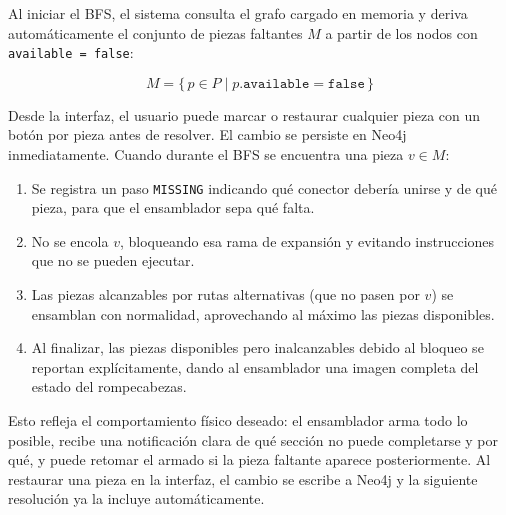\documentclass[12pt,a4paper]{article}
\begin{document}
Al iniciar el BFS, el sistema consulta el grafo cargado en memoria y deriva
automáticamente el conjunto de piezas faltantes $M$ a partir de los nodos
con \texttt{available = false}:

\[
    M = \{\, p \in P \mid p.\texttt{available} = \texttt{false} \,\}
\]

Desde la interfaz, el usuario puede marcar o restaurar cualquier pieza con un
botón por pieza antes de resolver. El cambio se persiste en Neo4j
inmediatamente. Cuando durante el BFS se encuentra una pieza $v \in M$:

\begin{enumerate}
    \item Se registra un paso \texttt{MISSING} indicando qué conector debería
          unirse y de qué pieza, para que el ensamblador sepa qué falta.
    \item No se encola $v$, bloqueando esa rama de expansión y evitando
          instrucciones que no se pueden ejecutar.
    \item Las piezas alcanzables por rutas alternativas (que no pasen por $v$)
          se ensamblan con normalidad, aprovechando al máximo las piezas disponibles.
    \item Al finalizar, las piezas disponibles pero inalcanzables debido al
          bloqueo se reportan explícitamente, dando al ensamblador una imagen
          completa del estado del rompecabezas.
\end{enumerate}

Esto refleja el comportamiento físico deseado: el ensamblador arma todo lo
posible, recibe una notificación clara de qué sección no puede completarse y
por qué, y puede retomar el armado si la pieza faltante aparece posteriormente.
Al restaurar una pieza en la interfaz, el cambio se escribe a Neo4j y la
siguiente resolución ya la incluye automáticamente.
\end{document}
